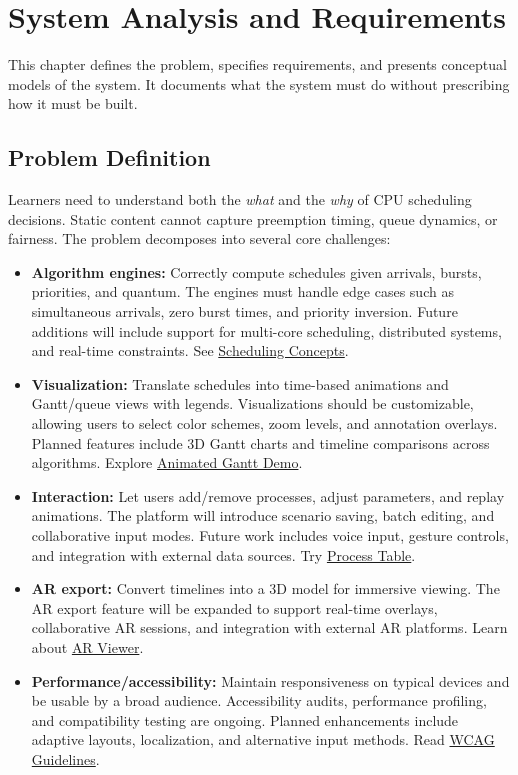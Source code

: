 \documentclass[12pt,a4paper,oneside]{report}
\begin{document}
\chapter{System Analysis and Requirements}
\noindent This chapter defines the problem, specifies requirements, and presents conceptual models of the system. It documents what the system must do without prescribing how it must be built.

\section{Problem Definition}
Learners need to understand both the \emph{what} and the \emph{why} of CPU scheduling decisions. Static content cannot capture preemption timing, queue dynamics, or fairness. The problem decomposes into several core challenges:
\begin{itemize}
  \item \textbf{Algorithm engines:} Correctly compute schedules given arrivals, bursts, priorities, and quantum. The engines must handle edge cases such as simultaneous arrivals, zero burst times, and priority inversion. Future additions will include support for multi-core scheduling, distributed systems, and real-time constraints. See \href{https://en.wikipedia.org/wiki/Scheduling_(computing)}{Scheduling Concepts}.
  \item \textbf{Visualization:} Translate schedules into time-based animations and Gantt/queue views with legends. Visualizations should be customizable, allowing users to select color schemes, zoom levels, and annotation overlays. Planned features include 3D Gantt charts and timeline comparisons across algorithms. Explore \href{https://osverse.shreyjain.me/animated-gantt}{Animated Gantt Demo}.
  \item \textbf{Interaction:} Let users add/remove processes, adjust parameters, and replay animations. The platform will introduce scenario saving, batch editing, and collaborative input modes. Future work includes voice input, gesture controls, and integration with external data sources. Try \href{https://osverse.shreyjain.me/process-table}{Process Table}.
  \item \textbf{AR export:} Convert timelines into a 3D model for immersive viewing. The AR export feature will be expanded to support real-time overlays, collaborative AR sessions, and integration with external AR platforms. Learn about \href{https://osverse.shreyjain.me/ar-viewer}{AR Viewer}.
  \item \textbf{Performance/accessibility:} Maintain responsiveness on typical devices and be usable by a broad audience. Accessibility audits, performance profiling, and compatibility testing are ongoing. Planned enhancements include adaptive layouts, localization, and alternative input methods. Read \href{https://www.w3.org/WAI/standards-guidelines/wcag/}{WCAG Guidelines}.
\end{itemize}
\end{document}
